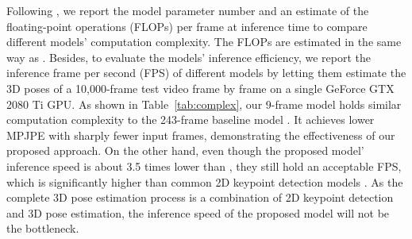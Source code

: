 \documentclass[journal]{IEEEtran}
\begin{document}
Following \cite{pavllo20193d}, we report the model parameter number and an estimate of the floating-point operations (FLOPs) per frame at inference time to compare different models' computation complexity. The FLOPs are estimated in the same way as \cite{pavllo20193d}. Besides, to evaluate the models' inference efficiency, we report the inference frame per second (FPS) of different models by letting them estimate the 3D poses of a 10,000-frame test video frame by frame on a single
GeForce GTX 2080 Ti GPU. As shown in Table~\ref{tab:complex}, our 9-frame model holds similar computation complexity to the 243-frame baseline model \cite{pavllo20193d}. It achieves lower MPJPE with sharply fewer input frames, demonstrating the effectiveness of our proposed approach. On the other hand, even though the proposed model' inference speed is about 3.5 times lower than \cite{pavllo20193d}, they still hold an acceptable FPS, which is significantly higher than common 2D keypoint detection models \cite{fang2017rmpe,cao2019openpose}. As the complete 3D pose estimation process is a combination of 2D keypoint detection and 3D pose estimation, the inference speed of the proposed model will not be the bottleneck.




 \begin{table*}[htbp]
  \small\centering
  \caption{\label{tab:complex} Computational complexity, MPJPE, and frame per second (FPS) of different models under Protocol 1 on Human3.6. The computational complexity is computed without test-time augmentation used by all the models. The two numbers of `` FLOPs'' for our models represent the estimated floating-point operations of the bone direction prediction network and the bone length prediction network, respectively.}
  \begin{threeparttable}
  \end{threeparttable}
\end{table*}
\end{document}
